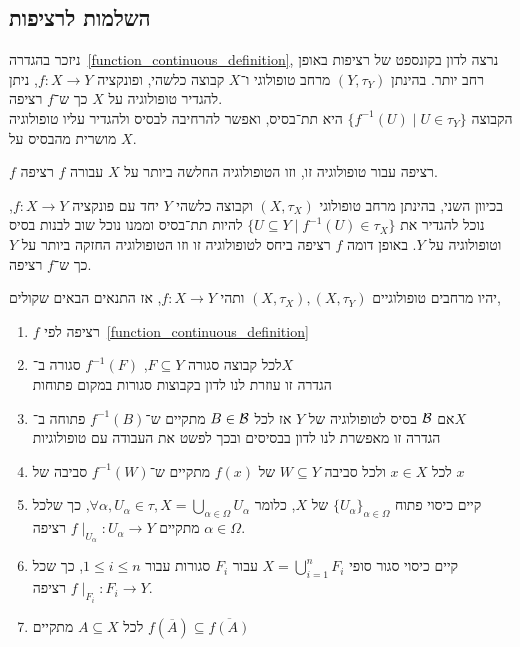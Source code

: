\subsection{השלמות לרציפות}
ניזכר בהגדרה\ \ref{function_continuous_definition}, נרצה לדון בקונספט של רציפות באופן רחב יותר.
בהינתן $(Y, \tau_Y)$ מרחב טופולוגי ו־$X$ קבוצה כלשהי, ופונקציה $f : X \to Y$, ניתן להגדיר טופולוגיה על $X$ כך ש־$f$ רציפה. \\
הקבוצה $\{ f^{-1}(U) \mid U \in \tau_Y \}$ היא תת־בסיס, ואפשר להרחיבה לבסיס ולהגדיר עליו טופולוגיה מושרית מהבסיס על $X$.
\begin{proposition}
	$f$ רציפה עבור טופולוגיה זו, וזו הטופולוגיה החלשה ביותר על $X$ עבורה $f$ רציפה.
\end{proposition}
בכיוון השני, בהינתן מרחב טופולוגי $(X, \tau_X)$ וקבוצה כלשהי $Y$ יחד עם פונקציה $f : X \to Y$, נוכל להגדיר את $\{ U \subseteq Y \mid f^{-1}(U) \in \tau_X \}$ להיות תת־בסיס וממנו נוכל שוב לבנות בסיס וטופולוגיה על $Y$.
באופן דומה $f$ רציפה ביחס לטופולוגיה זו וזו הטופולוגיה החזקה ביותר על $Y$ כך ש־$f$ רציפה.
\begin{proposition}
	יהיו מרחבים טופולוגיים $(X, \tau_X), (X, \tau_Y)$ ותהי $f : X \to Y$, אז התנאים הבאים שקולים,
	\begin{enumerate}
		\item $f$ רציפה לפי\ \ref{function_continuous_definition}
		\item לכל קבוצה סגורה $F \subseteq Y$, $f^{-1}(F)$ סגורה ב־$X$ \\
			הגדרה זו עוזרת לנו לדון בקבוצות סגורות במקום פתוחות
		\item אם $\mathcal{B}$ בסיס לטופולוגיה של $Y$ אז לכל $B \in \mathcal{B}$ מתקיים ש־$f^{-1}(B)$ פתוחה ב־$X$ \\
			הגדרה זו מאפשרת לנו לדון בבסיסים ובכך לפשט את העבודה עם טופולוגיות
		\item לכל $x \in X$ ולכל סביבה $W \subseteq Y$ של $f(x)$ מתקיים ש־$f^{-1}(W)$ סביבה של $x$
		\item קיים כיסוי פתוח ${\{U_\alpha\}}_{\alpha \in \Omega}$ של $X$, כלומר $\forall \alpha, U_\alpha \in \tau, X = \bigcup_{\alpha \in \Omega} U_\alpha$,
			כך שלכל $\alpha \in \Omega$ מתקיים $f \mid_{U_\alpha} : U_\alpha \to Y$ רציפה.
		\item קיים כיסוי סגור סופי $X = \bigcup_{i = 1}^n F_i$ עבור $F_i$ סגורות עבור $1 \le i \le n$, כך שכל $f \mid_{F_i} : F_i \to Y$ רציפה.
		\item לכל $A \subseteq X$ מתקיים $f(\overline{A}) \subseteq \overline{f(A)}$
	\end{enumerate}
\end{proposition}
